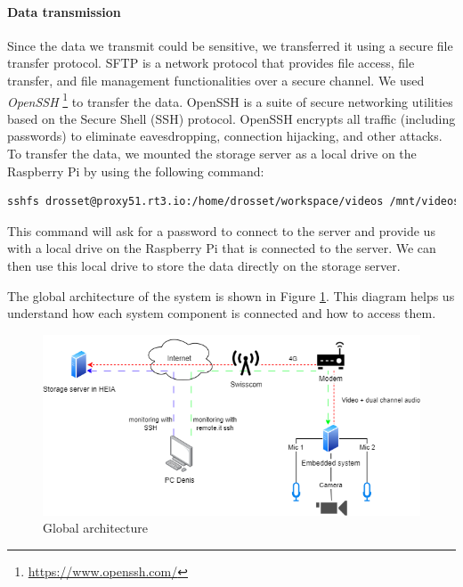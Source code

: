 \paragraph{Data transmission}

Since the data we transmit could be sensitive, we transferred it using a secure file transfer protocol. SFTP is a network protocol that provides file access, file transfer, and file management functionalities over a secure channel. We used \textit{OpenSSH} \footnote{\url{https://www.openssh.com/}} to transfer the data. OpenSSH is a suite of secure networking utilities based on the Secure Shell (SSH) protocol. OpenSSH encrypts all traffic (including passwords) to eliminate eavesdropping, connection hijacking, and other attacks. To transfer the data, we mounted the storage server as a local drive on the Raspberry Pi by using the following command:

\begin{lstlisting}[language=bash]
    sshfs drosset@proxy51.rt3.io:/home/drosset/workspace/videos /mnt/videos -p 33838
\end{lstlisting}

This command will ask for a password to connect to the server and provide us with a local drive on the Raspberry Pi that is connected to the server. We can then use this local drive to store the data directly on the storage server.

The global architecture of the system is shown in Figure \ref{fig:global_architecture}. This diagram helps us understand how each system component is connected and how to access them.

\begin{figure}[H]
    \centering
    \includegraphics[width=1\textwidth]{../Images/real_data_recording_system.drawio.png}
    \caption{Global architecture}
    \label{fig:global_architecture}
\end{figure}



